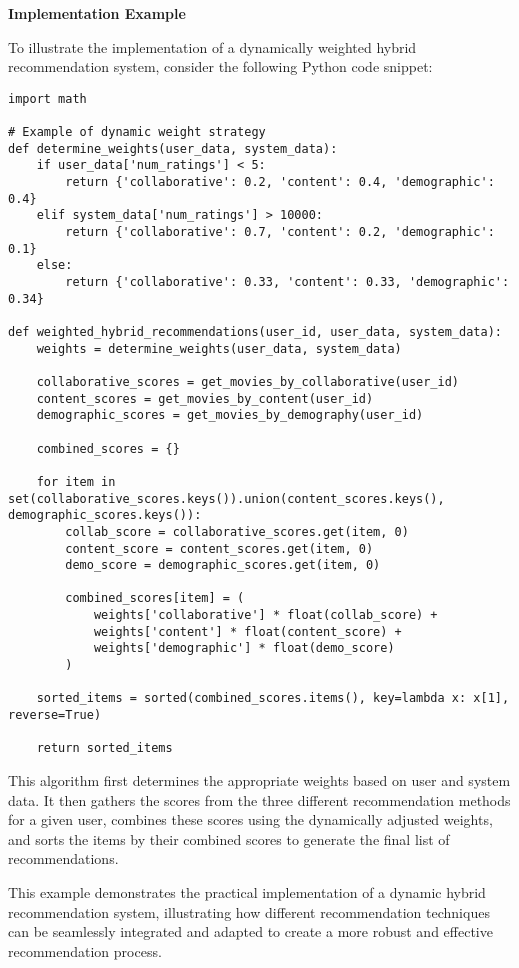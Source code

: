 \documentclass{article}
\begin{document}
\textbf{Implementation Example}

To illustrate the implementation of a dynamically weighted hybrid recommendation system, consider the following Python code snippet:

\begin{verbatim}
import math

# Example of dynamic weight strategy
def determine_weights(user_data, system_data):
    if user_data['num_ratings'] < 5:
        return {'collaborative': 0.2, 'content': 0.4, 'demographic': 0.4}
    elif system_data['num_ratings'] > 10000:
        return {'collaborative': 0.7, 'content': 0.2, 'demographic': 0.1}
    else:
        return {'collaborative': 0.33, 'content': 0.33, 'demographic': 0.34}

def weighted_hybrid_recommendations(user_id, user_data, system_data):
    weights = determine_weights(user_data, system_data)

    collaborative_scores = get_movies_by_collaborative(user_id)
    content_scores = get_movies_by_content(user_id)
    demographic_scores = get_movies_by_demography(user_id)

    combined_scores = {}

    for item in set(collaborative_scores.keys()).union(content_scores.keys(), demographic_scores.keys()):
        collab_score = collaborative_scores.get(item, 0)
        content_score = content_scores.get(item, 0)
        demo_score = demographic_scores.get(item, 0)

        combined_scores[item] = (
            weights['collaborative'] * float(collab_score) +
            weights['content'] * float(content_score) +
            weights['demographic'] * float(demo_score)
        )

    sorted_items = sorted(combined_scores.items(), key=lambda x: x[1], reverse=True)

    return sorted_items
\end{verbatim}

This algorithm first determines the appropriate weights based on user and system data. It then gathers the scores from the three different recommendation methods for a given user, combines these scores using the dynamically adjusted weights, and sorts the items by their combined scores to generate the final list of recommendations.

This example demonstrates the practical implementation of a dynamic hybrid recommendation system, illustrating how different recommendation techniques can be seamlessly integrated and adapted to create a more robust and effective recommendation process.
\end{document}
